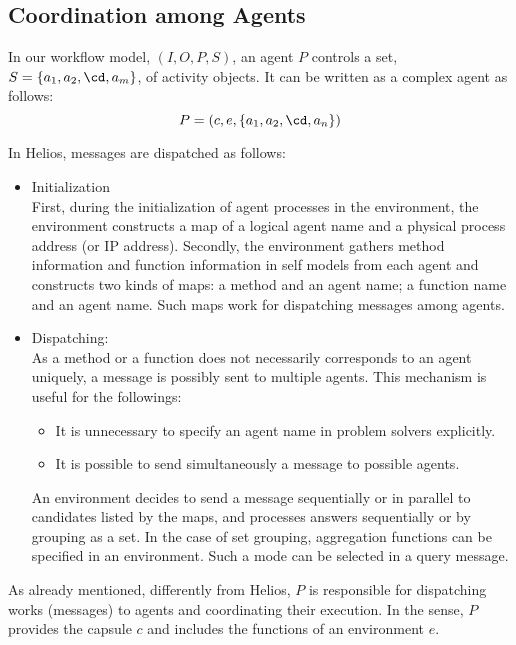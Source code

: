 \subsection{Coordination among Agents}

In our workflow model, $(I,O,P,S)$, an agent $P$ controls a set,
$S=\{a_1,a_2,\cd,a_m\}$, of activity objects.
It can be written as a complex agent as follows:
\[P=(c,e,\{a_1,a_2,\cd,a_n\})\]

In Helios, messages are dispatched as follows:
\begin{itemize}\itemsep0mm
\item Initialization\\
First, during the initialization of agent processes in the
environment, the environment constructs a map of a logical agent name
and a physical process address (or IP address).
Secondly, the environment gathers method information and function
information in self models from each agent and constructs two kinds of
maps: a method and an agent name; a function name and an agent name.
Such maps work for dispatching messages among agents.

\item Dispatching:\\
As a method or a function does not necessarily corresponds to an agent
uniquely, a message is possibly sent to multiple agents.
This mechanism is useful for the followings:
\begin{itemize}\itemsep0mm
\item It is unnecessary to specify an agent name in problem solvers
explicitly.
\item It is possible to send simultaneously a message to possible
agents.
\end{itemize}
An environment decides to send a message sequentially or in parallel to
candidates listed by the maps, and processes answers sequentially or
by grouping as a set.
In the case of set grouping, aggregation functions can be specified in
an environment.
Such a mode can be selected in a query message.
\end{itemize}

As already mentioned, differently from Helios, $P$ is responsible for
dispatching works (messages) to agents and coordinating their execution.
In the sense, $P$ provides the capsule $c$ and includes the functions
of an environment $e$.

